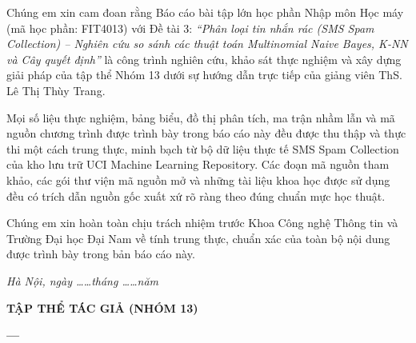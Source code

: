 
Chúng em xin cam đoan rằng Báo cáo bài tập lớn học phần Nhập môn Học máy (mã học phần: FIT4013) với Đề tài 3: \textit{“Phân loại tin nhắn rác (SMS Spam Collection) – Nghiên cứu so sánh các thuật toán Multinomial Naive Bayes, K-NN và Cây quyết định”} là công trình nghiên cứu, khảo sát thực nghiệm và xây dựng giải pháp của tập thể Nhóm 13 dưới sự hướng dẫn trực tiếp của giảng viên ThS. Lê Thị Thùy Trang.

Mọi số liệu thực nghiệm, bảng biểu, đồ thị phân tích, ma trận nhầm lẫn và mã nguồn chương trình được trình bày trong báo cáo này đều được thu thập và thực thi một cách trung thực, minh bạch từ bộ dữ liệu thực tế SMS Spam Collection của kho lưu trữ UCI Machine Learning Repository. Các đoạn mã nguồn tham khảo, các gói thư viện mã nguồn mở và những tài liệu khoa học được sử dụng đều có trích dẫn nguồn gốc xuất xứ rõ ràng theo đúng chuẩn mực học thuật.

Chúng em xin hoàn toàn chịu trách nhiệm trước Khoa Công nghệ Thông tin và Trường Đại học Đại Nam về tính trung thực, chuẩn xác của toàn bộ nội dung được trình bày trong bản báo cáo này.

\vspace{1cm}

\begin{flushright}
\begin{minipage}{9cm}
\centering
\textit{Hà Nội, ngày \ldots\ldots tháng \ldots\ldots năm \Nam}

\vspace{0.4cm}

\textbf{TẬP THỂ TÁC GIẢ (NHÓM 13)}

\vspace{2.2cm}

\textbf{\TenSinhVienMot \quad --- \quad \TenSinhVienHai}
\end{minipage}
\end{flushright}